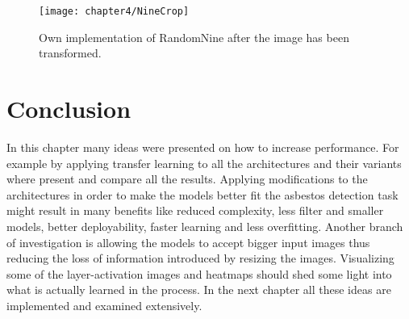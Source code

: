 \begin{figure}[!h]
  \centering
  \caption{Own implementation of RandomNine after the image has been transformed.}
  \texttt{[image: chapter4/NineCrop]}
  \label{fig:TenCrop}
\end{figure}


\section{Conclusion}

In this chapter many ideas were presented on how to increase performance. For example by applying transfer learning to all the architectures and their variants where present and compare all the results. Applying modifications to the architectures in order to make the models better fit the asbestos detection task might result in many benefits like reduced complexity, less filter and smaller models, better deployability, faster learning and less overfitting. Another branch of investigation is allowing the models to accept bigger input images thus reducing the loss of information introduced by resizing the images. Visualizing some of the layer-activation images and heatmaps should shed some light into what is actually learned in the process. In the next chapter all these ideas are implemented and examined extensively.